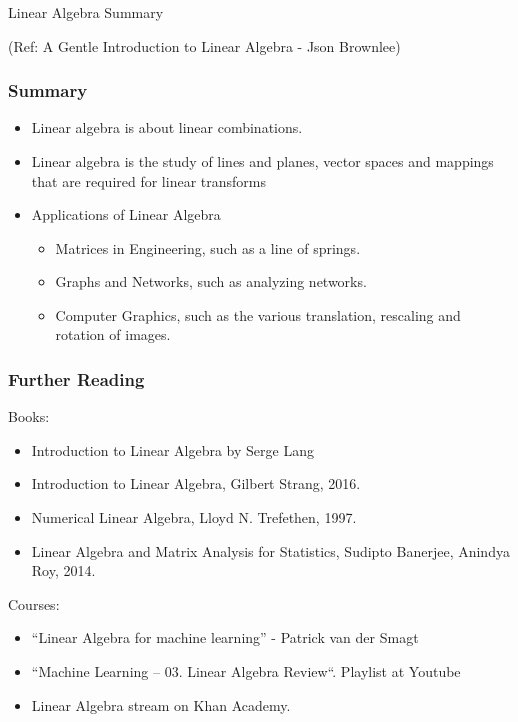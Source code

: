 \begin{frame}[fragile]\frametitle{}
\begin{center}
{\Large Linear Algebra Summary}

{\tiny (Ref: A Gentle Introduction to Linear Algebra
 - Json Brownlee)}

\end{center}
\end{frame}


 \begin{frame}[fragile] \frametitle{Summary}

\begin{itemize}

\item Linear algebra is about linear combinations.
\item Linear algebra is the study of lines and planes, vector spaces and mappings that are required for linear transforms
\item Applications of Linear Algebra
\begin{itemize}
\item Matrices in Engineering, such as a line of springs.
\item Graphs and Networks, such as analyzing networks.
\item Computer Graphics, such as the various translation, rescaling and rotation of images.
\end{itemize}

\end{itemize}

\end{frame}

 \begin{frame}[fragile] \frametitle{Further Reading}

Books:

\begin{itemize}
\item Introduction to Linear Algebra by Serge Lang
\item Introduction to Linear Algebra, Gilbert Strang, 2016.
\item  Numerical Linear Algebra, Lloyd N. Trefethen, 1997.
\item  Linear Algebra and Matrix Analysis for Statistics, Sudipto Banerjee, Anindya Roy, 2014.
\end{itemize}

Courses:

\begin{itemize}

\item  “Linear Algebra for machine learning” - Patrick van der Smagt 
\item “Machine Learning – 03. Linear Algebra Review“. Playlist at Youtube
\item  Linear Algebra stream on Khan Academy.
\end{itemize}



\end{frame}
